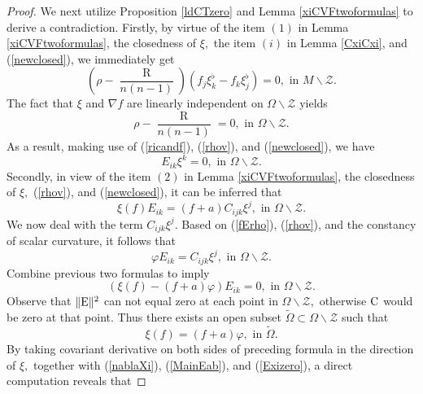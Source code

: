 \documentclass[10pt,leqno,oneside]{amsart}
\begin{document}
{\begin{proof}
       We next utilize Proposition \ref{ldCTzero} and Lemma \ref{xiCVFtwoformulas} to derive a contradiction. Firstly, by virtue of the item $(1)$ in Lemma \ref{xiCVFtwoformulas}, the closedness of $\xi,$ the item $(i)$ in Lemma \ref{CxiCxi}, and (\ref{newclosed}), we immediately get
       \[(\rho-\frac{\operatorname R}{n(n-1)})(f_j\xi_k^{\flat}-f_k\xi_j^{\flat})=0,\text{~in~} M\backslash \mathcal{Z}.\]
       The fact that $\xi$ and $\nabla f$ are linearly independent on $\Omega\backslash \mathcal{Z}$ yields
       \begin{equation}\label{rhov}
         \rho-\frac{\operatorname R}{n(n-1)}=0,\text{~in~} \Omega\backslash \mathcal{Z}.
       \end{equation}
       As a result, making use of (\ref{ricandf}), (\ref{rhov}), and (\ref{newclosed}), we have
       \begin{equation}\label{Exizero}
         E_{ik}\xi^k=0,\text{~in~} \Omega\backslash \mathcal{Z}.%
       \end{equation}
       Secondly, in view of the item $(2)$ in Lemma \ref{xiCVFtwoformulas}, the closedness of $\xi,$ (\ref{rhov}), and (\ref{newclosed}), it can be inferred that
       \[\xi(f)E_{ik}=(f+a)C_{ijk}\xi^j,\text{~in~} \Omega\backslash \mathcal{Z}.\]
       We now deal with the term $C_{ijk}\xi^j.$ Based on (\ref{fErho}), (\ref{rhov}), and the constancy of scalar curvature, it follows that
       \begin{equation*}\label{varphiECxi}\varphi E_{ik}=C_{ijk}\xi^j,\text{~in~} \Omega\backslash \mathcal{Z}.\end{equation*}
       Combine previous two formulas to imply
       \begin{equation*}\label{xiffvarphi}
       \left(\xi(f)-(f+a)\varphi\right)E_{ik}=0,\text{~in~} \Omega\backslash \mathcal{Z}.
       \end{equation*}
       Observe that $\|{\rm E}\|^2$ can not equal zero at each point in $\Omega\backslash \mathcal{Z},$ otherwise ${\rm C}$ would be zero at that point. Thus there exists an open subset $\widetilde{\Omega}\subset \Omega\backslash \mathcal{Z}$ such that
       \begin{equation*}\label{xiffvarphi}
         \xi(f)=(f+a)\varphi,\text{~in~} \widetilde{\Omega}.
       \end{equation*}
       By taking covariant derivative on both sides of preceding formula in the direction of $\xi,$ together with (\ref{nablaXi}), (\ref{MainEab}), and (\ref{Exizero}), a direct computation reveals that

\end{proof}}
\end{document}
